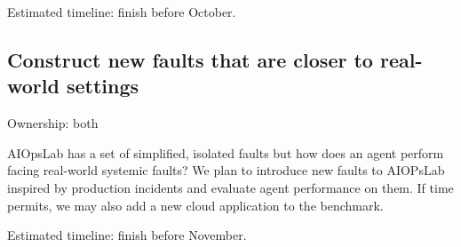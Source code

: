 \documentclass[conference]{IEEEtran}
\begin{document}
Estimated timeline: finish before October. 
\subsection{Construct new faults that are closer to real-world settings}
Ownership: both 

AIOpsLab has a set of simplified, isolated faults but how does an agent perform facing real-world systemic faults? We plan to introduce new faults to AIOPsLab inspired by production incidents and evaluate agent performance on them. If time permits, we may also add a new cloud application to the benchmark.

Estimated timeline: finish before November. 





\vspace{12pt}
\end{document}
